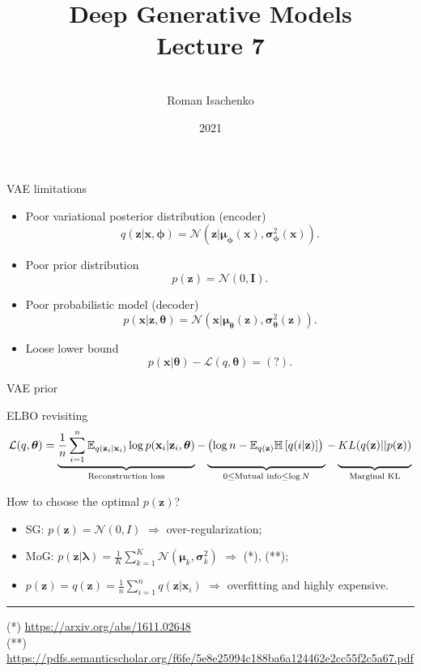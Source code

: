 \documentclass{beamer}
\title[\hbox to 56mm{Deep Generative Models  \hfill\insertframenumber\,/\,\inserttotalframenumber}]
{Deep Generative Models \\ Lecture 7}
\author[Roman Isachenko]{\\Roman Isachenko}
\institute[Ozon]{Ozon Masters \\
}
\date{2021}
\newcommand{\bx}{\mathbf{x}}
\newcommand{\bz}{\mathbf{z}}
\newcommand{\bmu}{\boldsymbol{\mu}}
\newcommand{\blambda}{\boldsymbol{\lambda}}
\newcommand{\bsigma}{\boldsymbol{\sigma}}
\newcommand{\btheta}{\boldsymbol{\theta}}
\newcommand{\bphi}{\boldsymbol{\phi}}
\begin{document}
\begin{frame}
\titlepage
\end{frame}
\begin{frame}{VAE limitations}
	\begin{itemize}
		\item Poor variational posterior distribution (encoder)
		\[
		q(\bz | \bx, \bphi) = \mathcal{N}(\bz| \bmu_{\bphi}(\bx), \bsigma^2_{\bphi}(\bx)).
		\]
		\item Poor prior distribution
		\[
		p(\bz) = \mathcal{N}(0, \mathbf{I}).
		\]
		\item Poor probabilistic model (decoder)
		\[
		p(\bx | \bz, \btheta) = \mathcal{N}(\bx| \bmu_{\btheta}(\bz), \bsigma^2_{\btheta}(\bz)).
		\]
		\item Loose lower bound
		\[
		p(\bx | \btheta) - \mathcal{L}(q, \btheta) = (?).
		\]
	\end{itemize}
\end{frame}
\begin{frame}{VAE prior}
	\begin{block}{ELBO revisiting}
		\vspace{-0.3cm}
		{\footnotesize
			\[
			\mathcal{L}(q, \btheta) = \underbrace{\frac{1}{n} \sum_{i=1}^n \mathbb{E}_{q(\bz_i | \bx_i)} \log p(\bx_i | \bz_i, \btheta)}_{\text{Reconstruction loss}} - \underbrace{\left(\log n - \mathbb{E}_{q(\bz)} \mathbb{H} \left[ q(i | \bz) \right] \right)\vphantom{\sum_{i=1}}}_{0 \leq \text{Mutual info} \leq \log N } - \underbrace{KL(q(\bz) || p(\bz))\vphantom{\sum_{i=1}}}_{\text{Marginal KL}}
			\]}
	\end{block}
	
	How to choose the optimal $p(\bz)$?
	\begin{itemize}
		\item SG: $p(\bz) = \mathcal{N}(0, I)$ $\Rightarrow$ over-regularization;
		\vspace{0.1cm}
		\item MoG: $p(\bz | \blambda) = \frac{1}{K} \sum_{k=1}^K \mathcal{N}(\bmu_k, \bsigma_k^2)$ $\Rightarrow$ (*), (**);
		\vspace{0.1cm}
		\item $p(\bz) = q(\bz) = \frac{1}{n}\sum_{i=1}^n q(\bz | \bx_i)$ $\Rightarrow$ overfitting and highly expensive.
	\end{itemize}
	\vfill
	\hrule\medskip
	{\tiny 
		(*) \href{https://arxiv.org/abs/1611.02648}{https://arxiv.org/abs/1611.02648} \\
		(**) \href{https://pdfs.semanticscholar.org/f6fe/5e8e25994c188ba6a124462e2cc55f2c5a67.pdf}{https://pdfs.semanticscholar.org/f6fe/5e8e25994c188ba6a124462e2cc55f2c5a67.pdf}}
	
\end{frame}
\end{document}
